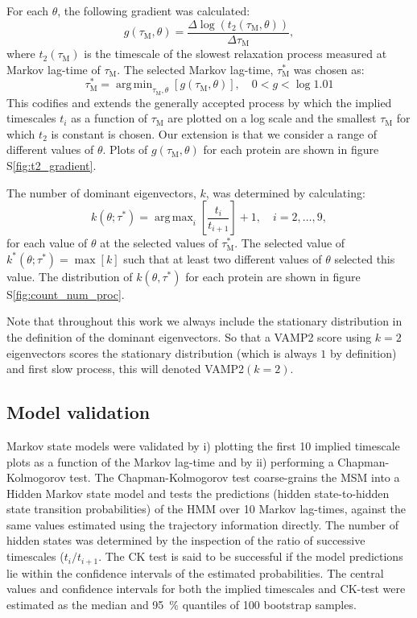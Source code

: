 \documentclass[journal=jacsat,manuscript=article]{achemso}
\DeclareMathOperator*{\argmax}{arg\,max}
\DeclareMathOperator*{\argmin}{arg\,min}
\newcommand*\sref[1]{%
    S\ref{#1}}
\begin{document}
For each $\theta$, the following gradient was calculated:
\begin{equation}
    g(\tau_{\mathrm{M}}, \theta) = \frac{\Delta \log{\left(t_{2}(\tau_{\mathrm{M}}, \theta)\right)}}{\Delta \tau_{\mathrm{M}}}, 
\end{equation}
where $t_{2}(\tau_{\mathrm{M}})$ is the timescale of the slowest relaxation process measured at Markov lag-time of $\tau_{\mathrm{M}}$. The selected Markov lag-time, $\tau^{*}_{\mathrm{M}}$ was chosen as:
\begin{equation}
    \tau^{*}_{\mathrm{M}}  = \argmin_{\tau_{\mathrm{M}}, \theta}\left[g(\tau_{\mathrm{M}}, \theta)\right], \quad 0 < g < \log{1.01}
\end{equation}
This codifies and extends the generally accepted process by which the implied timescales $t_{i}$ as a function of $\tau_{\mathrm{M}}$ are plotted on a log scale and the smallest $\tau_{\mathrm{M}}$ for which $t_{2}$ is constant is chosen. Our extension is that we consider a range of different values of $\theta$. Plots of $g(\tau_{\mathrm{M}}, \theta)$ for each protein are shown  in figure \sref{fig:t2_gradient}. 

The number of dominant eigenvectors, $k$, was determined by calculating:
\begin{equation}
    k(\theta; \tau^{*}) = \argmax_{i}{\left[\frac{t_{i}}{t_{i+1}}\right]} + 1, \quad i = 2, \ldots, 9, 
\end{equation}
for each value of $\theta$ at the selected values of $\tau^{*}_{\mathrm{M}}$. The selected value of $k^{*}(\theta; \tau^{*}) = \max{\left[k\right]}$ such that at least two different values of $\theta$  selected this value.  The distribution of $k(\theta, \tau^{*})$ for each protein are shown in figure \sref{fig:count_num_proc}. 

Note that throughout this work we always include the stationary distribution in the definition of the dominant eigenvectors.  So that a VAMP2 score using $k=2$ eigenvectors scores the stationary distribution (which is always $1$ by definition) and first slow process, this will denoted VAMP2$(k=2)$. 

\subsection{Model validation}

Markov state models were validated by i) plotting the first \num{10} implied timescale plots as a function of the Markov lag-time and by ii) performing a Chapman-Kolmogorov test.  The Chapman-Kolmogorov test coarse-grains the MSM into a Hidden Markov state model and tests the predictions (hidden state-to-hidden state transition probabilities) of the HMM over 10 Markov lag-times, against the same values estimated using the trajectory information directly.  The number of hidden states was determined by the inspection of the ratio of successive timescales ($t_{i}/t_{i+1}$. The CK test is said to be successful if the model predictions lie within the confidence intervals of the estimated probabilities. The central values and confidence intervals for both the implied timescales and CK-test were estimated as the median and \SI{95}{\percent} quantiles of \num{100} bootstrap samples.  
\end{document}
